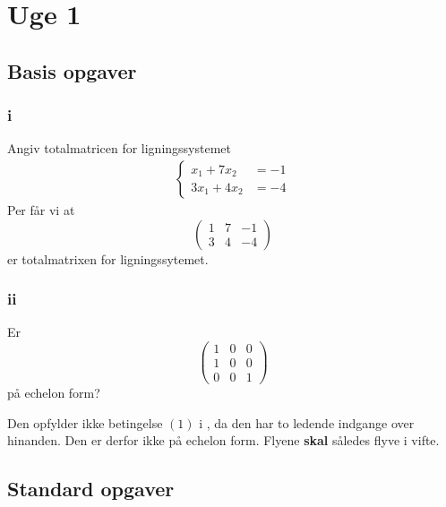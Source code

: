
\chapter{Uge 1}

	\section{Basis opgaver}

		\subsection{i}

		Angiv totalmatricen for ligningssystemet
		\begin{align*}
			\left\{\begin{aligned} x_{1}+7 x_{2} &=-1 \\ 3 x_{1}+4 x_{2} &=-4 \end{aligned}\right.
		\end{align*} 
		Per \cite[Eksempel 1.1.2]{hesselholt2017} får vi at
			\begin{equation}
				\left(\begin{array}{rr|r} {1} & {7} & {-1} \\ {3} & {4} & {-4} \end{array}\right)
			\end{equation}
		er totalmatrixen for ligningssytemet.

		\subsection{ii}

		Er
			\begin{equation}
				\left(\begin{array}{lll}{1} & {0} & {0} \\ {1} & {0} & {0} \\ {0} & {0} & {1}\end{array}\right)
			\end{equation}
		på echelon form?

		Den opfylder ikke betingelse $(1)$ i \cite[Def. 1.2.7]{hesselholt2017}, da den har to ledende indgange over hinanden. Den er derfor ikke på echelon form. Flyene \textbf{skal} således flyve i vifte.

	\section{Standard opgaver}

